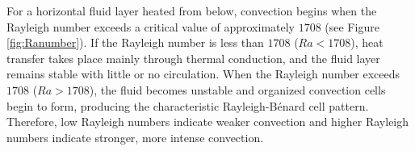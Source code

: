 For a horizontal fluid layer heated from below, convection begins when the Rayleigh number exceeds a critical value of approximately $1708$ (see Figure \ref{fig:Ranumber}). If the Rayleigh number is less than $1708$ ($Ra < 1708$), heat transfer takes place mainly through thermal conduction, and the fluid layer remains stable with little or no circulation. When the Rayleigh number exceeds $1708$ ($Ra > 1708$), the fluid becomes unstable and organized convection cells begin to form, producing the characteristic Rayleigh-B\'{e}nard cell pattern. Therefore, low Rayleigh numbers indicate weaker convection and higher Rayleigh numbers indicate stronger, more intense convection.







